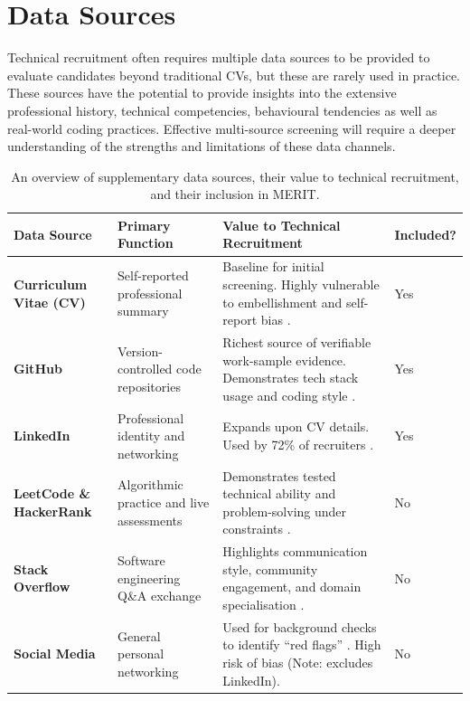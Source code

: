 \section{Data Sources}
\label{sec:data-sources}
Technical recruitment often requires multiple data sources to be provided to evaluate candidates beyond traditional CVs, but these are rarely used in practice. These sources have the potential to provide insights into the extensive professional history, technical competencies, behavioural tendencies as well as real-world coding practices. Effective multi-source screening will require a deeper understanding of the strengths and limitations of these data channels.


\begin{table}[htbp]
    \centering
    \caption[Overview of supplementary recruitment data sources]{An overview of supplementary data sources, their value to technical recruitment, and their inclusion in MERIT.}
    \label{tab:data-sources}
    \small
    \renewcommand{\arraystretch}{1.4}
    \begin{tabularx}{\textwidth}{>{\raggedright\arraybackslash\bfseries}p{2.6cm} >{\raggedright\arraybackslash}p{3.2cm} >{\raggedright\arraybackslash}X >{\centering\arraybackslash}p{1.5cm}}
        \hline
        \textbf{Data Source} & \textbf{Primary Function} & \textbf{Value to Technical Recruitment} & \textbf{Included?} \\ \hline
        Curriculum Vitae (CV) & Self-reported professional summary & Baseline for initial screening. Highly vulnerable to embellishment and self-report bias \cite{henle2019_resume_fraud,dunning2004}. & Yes \\
        GitHub & Version-controlled code repositories & Richest source of verifiable work-sample evidence. Demonstrates tech stack usage and coding style \cite{hackerrank2018skills,hackerrank2024skills}. & Yes \\
        LinkedIn & Professional identity and networking & Expands upon CV details. Used by 72\% of recruiters \cite{jobvite2020}. & Yes \\
        LeetCode \& HackerRank & Algorithmic practice and live assessments & Demonstrates tested technical ability and problem-solving under constraints \cite{coderpad2025techhiring}. & No \\
        Stack Overflow & Software engineering Q\&A exchange & Highlights communication style, community engagement, and domain specialisation \cite{vasilescu2013}. & No \\
        Social Media & General personal networking & Used for background checks to identify ``red flags'' \cite{careerbuilder2017_social}. High risk of bias (Note: excludes LinkedIn). & No \\ \hline
    \end{tabularx}
\end{table}

